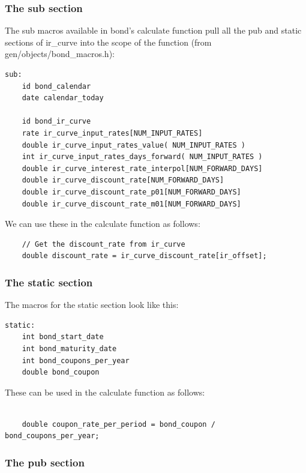 \documentclass{report}
\begin{document}
\subsubsection{The sub section}

The sub macros available in bond's calculate function pull all the pub and static sections of ir_curve into the scope of the function (from gen/objects/bond_macros.h):

\begin{verbatim}
sub:
    id bond_calendar
    date calendar_today

    id bond_ir_curve
    rate ir_curve_input_rates[NUM_INPUT_RATES]
    double ir_curve_input_rates_value( NUM_INPUT_RATES )
    int ir_curve_input_rates_days_forward( NUM_INPUT_RATES )
    double ir_curve_interest_rate_interpol[NUM_FORWARD_DAYS]
    double ir_curve_discount_rate[NUM_FORWARD_DAYS]
    double ir_curve_discount_rate_p01[NUM_FORWARD_DAYS]
    double ir_curve_discount_rate_m01[NUM_FORWARD_DAYS]
\end{verbatim}

We can use these in the calculate function as follows:

\begin{verbatim}
    // Get the discount_rate from ir_curve
    double discount_rate = ir_curve_discount_rate[ir_offset];
\end{verbatim}

\subsubsection{The static section}

The macros for the static section look like this:


\begin{verbatim}
static:
    int bond_start_date
    int bond_maturity_date
    int bond_coupons_per_year
    double bond_coupon
\end{verbatim}

These can be used in the calculate function as follows:

\begin{verbatim}

    double coupon_rate_per_period = bond_coupon / bond_coupons_per_year;

\end{verbatim}


\subsubsection{The pub section}
\end{document}
